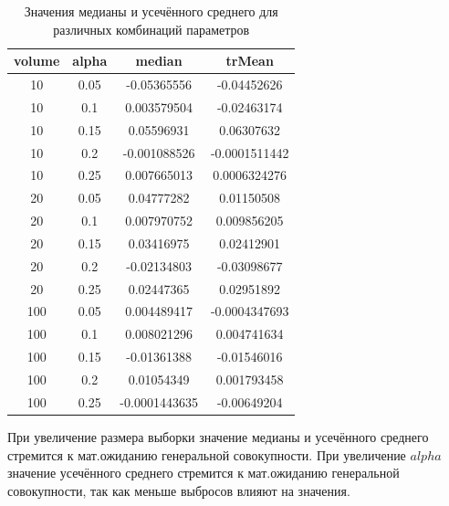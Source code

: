 \documentclass{article} %
\begin{document}
\begin{table}[H]
\centering
\begin{tabular}{|c|c|c|c|}
\hline
\textbf{volume} & \textbf{alpha} & \textbf{median} & \textbf{trMean} \\ \hline
10              & 0.05           & -0.05365556     & -0.04452626     \\ \hline
10              & 0.1            & 0.003579504     & -0.02463174     \\ \hline
10              & 0.15           & 0.05596931      & 0.06307632      \\ \hline
10              & 0.2            & -0.001088526    & -0.0001511442   \\ \hline
10              & 0.25           & 0.007665013     & 0.0006324276    \\ \hline
20              & 0.05           & 0.04777282      & 0.01150508      \\ \hline
20              & 0.1            & 0.007970752     & 0.009856205     \\ \hline
20              & 0.15           & 0.03416975      & 0.02412901      \\ \hline
20              & 0.2            & -0.02134803     & -0.03098677     \\ \hline
20              & 0.25           & 0.02447365      & 0.02951892      \\ \hline
100             & 0.05           & 0.004489417     & -0.0004347693   \\ \hline
100             & 0.1            & 0.008021296     & 0.004741634     \\ \hline
100             & 0.15           & -0.01361388     & -0.01546016     \\ \hline
100             & 0.2            & 0.01054349      & 0.001793458     \\ \hline
100             & 0.25           & -0.0001443635   & -0.00649204     \\ \hline
\end{tabular}
\caption{Значения медианы и усечённого среднего
для различных комбинаций параметров}
\end{table}

При увеличение размера выборки значение медианы
и усечённого среднего стремится к мат.ожиданию
генеральной совокупности.
При увеличение $alpha$ значение усечённого среднего
стремится к мат.ожиданию генеральной совокупности,
так как меньше выбросов влияют на значения.
\end{document}
